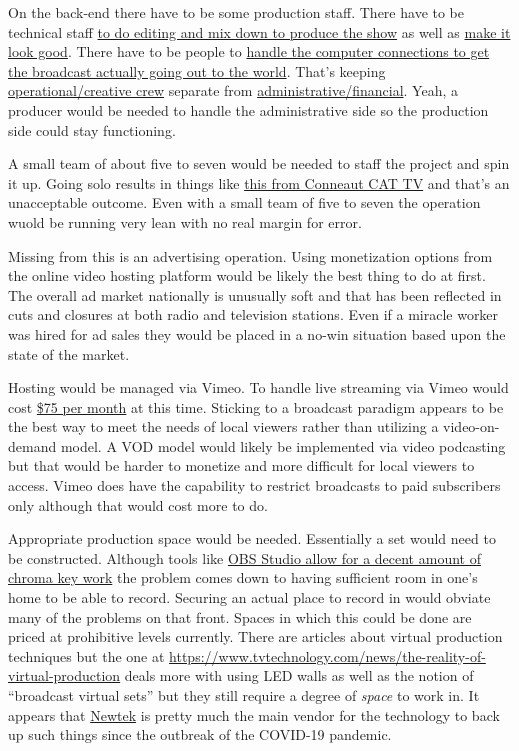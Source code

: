 On the back-end there have to be some production staff. There have to be
technical staff
\href{https://en.wikipedia.org/w/index.php?title=Production_control_room&oldid=1087451141}{to
do editing and mix down to produce the show} as well as
\href{https://en.wikipedia.org/w/index.php?title=Broadcast_designer&oldid=1096142751}{make
it look good}. There have to be people to
\href{https://en.wikipedia.org/w/index.php?title=Transmission_control_room&oldid=1107297485}{handle
the computer connections to get the broadcast actually going out to the
world}. That's keeping
\href{https://en.wikipedia.org/w/index.php?title=Television_crew&oldid=1121314540}{operational/creative
crew} separate from
\href{https://en.wikipedia.org/w/index.php?title=Television_producer&oldid=1133167514}{administrative/financial}.
Yeah, a producer would be needed to handle the administrative side so
the production side could stay functioning.

A small team of about five to seven would be needed to staff the project
and spin it up. Going solo results in things like
\href{https://vimeo.com/803474271}{this from Conneaut CAT TV} and that's
an unacceptable outcome. Even with a small team of five to seven the
operation wuold be running very lean with no real margin for error.

Missing from this is an advertising operation. Using monetization
options from the online video hosting platform would be likely the best
thing to do at first. The overall ad market nationally is unusually soft
and that has been reflected in cuts and closures at both radio and
television stations. Even if a miracle worker was hired for ad sales
they would be placed in a no-win situation based upon the state of the
market.

Hosting would be managed via Vimeo. To handle live streaming via Vimeo
would cost \href{https://vimeo.com/upgrade}{\$75 per month} at this
time. Sticking to a broadcast paradigm appears to be the best way to
meet the needs of local viewers rather than utilizing a video-on-demand
model. A VOD model would likely be implemented via video podcasting but
that would be harder to monetize and more difficult for local viewers to
access. Vimeo does have the capability to restrict broadcasts to paid
subscribers only although that would cost more to do.

Appropriate production space would be needed. Essentially a set would
need to be constructed. Although tools like
\href{https://obsproject.com/kb/chroma-key-filter}{OBS Studio allow for
a decent amount of chroma key work} the problem comes down to having
sufficient room in one's home to be able to record. Securing an actual
place to record in would obviate many of the problems on that front.
Spaces in which this could be done are priced at prohibitive levels
currently. There are articles about virtual production techniques but
the one at
\url{https://www.tvtechnology.com/news/the-reality-of-virtual-production}
deals more with using LED walls as well as the notion of ``broadcast
virtual sets'' but they still require a degree of \emph{space} to work
in. It appears that \href{https://www.newtek.com}{Newtek} is pretty much
the main vendor for the technology to back up such things since the
outbreak of the COVID-19 pandemic.

